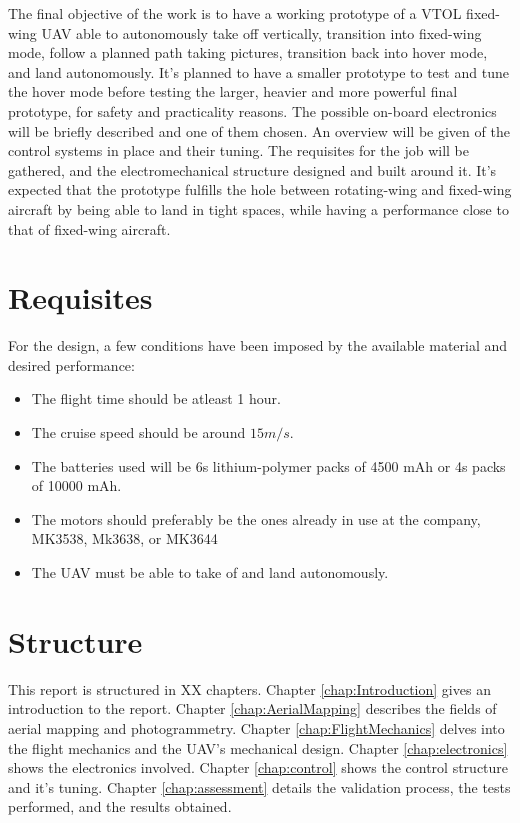 %
The final objective of the work is to have a working prototype of a VTOL fixed-wing UAV able to autonomously take off vertically, transition into fixed-wing mode, follow a planned path taking pictures, transition back into hover mode, and land autonomously.
%
It's planned to have a smaller prototype to test and tune the hover mode before testing the larger, heavier and more powerful final prototype, for safety and practicality reasons.
%
The possible on-board electronics will be briefly described and one of them chosen.
%
An overview will be given of the control systems in place and their tuning.
%
The requisites for the job will be gathered, and the electromechanical structure designed and built around it.
%
It's expected that the prototype fulfills the hole between rotating-wing and fixed-wing aircraft by being able to land in tight spaces, while having a performance close to that of fixed-wing aircraft.

\section{Requisites}

For the design, a few conditions have been imposed by the available material and desired performance:

\begin{itemize}

\item The flight time should be atleast 1 hour.
\item The cruise speed should be around $15 m/s$.
\item The batteries used will be 6s lithium-polymer packs of 4500 mAh or 4s packs of 10000 mAh.
\item The motors should preferably be the ones already in use at the company, MK3538, Mk3638, or MK3644
\item The UAV must be able to take of and land autonomously.

\end{itemize}


\section{Structure}
	
%
This report is structured in XX  chapters.
%
Chapter \ref{chap:Introduction} gives an introduction to the report.
%
Chapter \ref{chap:AerialMapping} describes the fields of aerial mapping and photogrammetry.
%
Chapter \ref{chap:FlightMechanics} delves into the flight mechanics and the UAV's mechanical design.
%
Chapter \ref{chap:electronics} shows the electronics involved.
%
Chapter \ref{chap:control} shows the control structure and it's tuning.
%
Chapter \ref{chap:assessment} details the validation process, the tests performed, and the results obtained.

